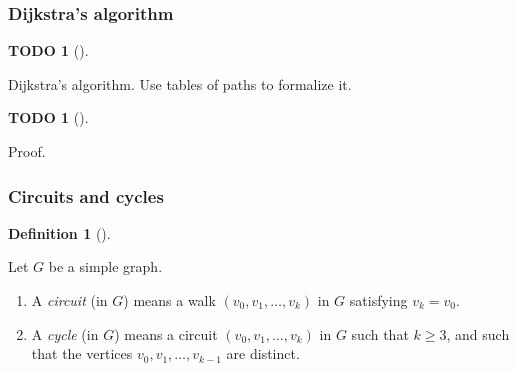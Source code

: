 \documentclass[numbers=enddot,12pt,final,onecolumn,notitlepage]{scrartcl}%
\theoremstyle{definition}
\newtheorem{defi}[theo]{Definition}
\newenvironment{definition}[1][]
{\begin{defi}[#1]\begin{leftbar}}
{\end{leftbar}\end{defi}}
\newtheorem{quest}[theo]{TODO}
\newenvironment{todo}[1][]
{\begin{quest}[#1]\begin{leftbar}}
{\end{leftbar}\end{quest}}
\newcommand{\tup}[1]{\left( #1 \right)}
\begin{document}
\subsubsection{Dijkstra's algorithm}

\begin{todo}
Dijkstra's algorithm. Use tables of paths to formalize it.
\end{todo}

\begin{todo}
Proof.
\end{todo}

\subsubsection{Circuits and cycles}

\begin{definition} \label{def.intro.circuits}
Let $G$ be a simple graph.

\begin{enumerate}

\item[\textbf{(a)}] A \textit{circuit} (in $G$) means a walk
$\tup{v_0, v_1, \ldots, v_k}$ in $G$ satisfying $v_k = v_0$.

\item[\textbf{(b)}] A \textit{cycle} (in $G$) means a circuit
$\tup{v_0, v_1, \ldots, v_k}$ in $G$ such that $k \geq 3$, and such
that the vertices $v_0, v_1, \ldots, v_{k-1}$ are distinct.

\end{enumerate}

\end{definition}
\end{document}
